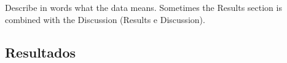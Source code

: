 

Describe in words what the data means. Sometimes the Results section is combined with the Discussion (Results e Discussion).


\subsection{Resultados}
\label{resultados}
